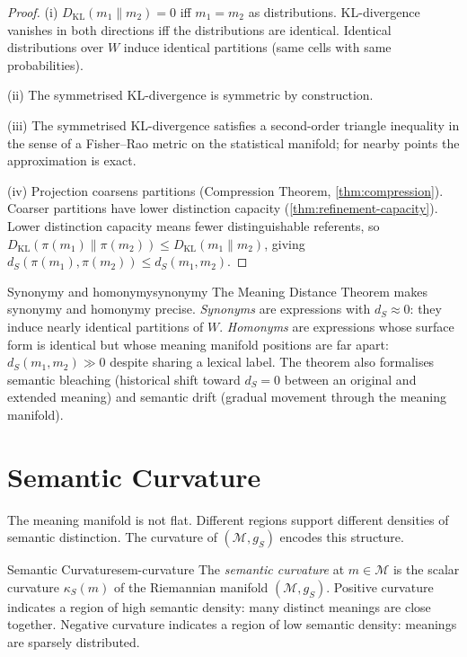 \documentclass[12pt,twoside,openright]{book}
\begin{document}
\begin{proof}
  (i) $D_\mathrm{KL}(m_1 \| m_2) = 0$ iff $m_1 = m_2$
  as distributions. KL-divergence vanishes in both
  directions iff the distributions are identical.
  Identical distributions over $W$ induce identical
  partitions (same cells with same probabilities).

  (ii) The symmetrised KL-divergence is symmetric
  by construction.

  (iii) The symmetrised KL-divergence satisfies a
  second-order triangle inequality in the sense of
  a Fisher--Rao metric on the statistical manifold;
  for nearby points the approximation is exact.

  (iv) Projection coarsens partitions
  (Compression Theorem, \cref{thm:compression}).
  Coarser partitions have lower distinction capacity
  (\cref{thm:refinement-capacity}).
  Lower distinction capacity means fewer
  distinguishable referents, so
  $D_\mathrm{KL}(\pi(m_1) \| \pi(m_2))
  \le D_\mathrm{KL}(m_1 \| m_2)$,
  giving $d_S(\pi(m_1), \pi(m_2)) \le d_S(m_1, m_2)$.
\end{proof}

\begin{remark}{Synonymy and homonymy}{synonymy}
  The Meaning Distance Theorem makes synonymy and
  homonymy precise.
  \emph{Synonyms} are expressions with $d_S \approx 0$:
  they induce nearly identical partitions of $W$.
  \emph{Homonyms} are expressions whose surface form
  is identical but whose meaning manifold positions are
  far apart: $d_S(m_1, m_2) \gg 0$ despite sharing
  a lexical label.
  The theorem also formalises semantic bleaching
  (historical shift toward $d_S = 0$ between an original
  and extended meaning) and semantic drift
  (gradual movement through the meaning manifold).
\end{remark}

\section{Semantic Curvature}

The meaning manifold is not flat. Different regions
support different densities of semantic distinction.
The curvature of $(\mathcal{M}, g_S)$ encodes this
structure.

\begin{definition}{Semantic Curvature}{sem-curvature}
  The \emph{semantic curvature} at $m \in \mathcal{M}$
  is the scalar curvature $\kappa_S(m)$ of the
  Riemannian manifold $(\mathcal{M}, g_S)$.
  Positive curvature indicates a region of high
  semantic density: many distinct meanings are close
  together.
  Negative curvature indicates a region of low semantic
  density: meanings are sparsely distributed.
\end{definition}
\end{document}

